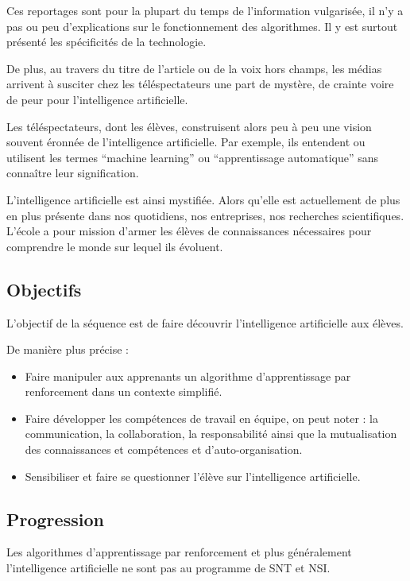 \documentclass[
12pt,
french,
]{article}
\begin{document}
Ces reportages sont pour la plupart du temps de l'information
vulgarisée, il n'y a pas ou peu d'explications sur le fonctionnement des
algorithmes. Il y est surtout présenté les spécificités de la
technologie.

De plus, au travers du titre de l'article ou de la voix hors champs, les
médias arrivent à susciter chez les téléspectateurs une part de mystère,
de crainte voire de peur pour l'intelligence artificielle.

Les téléspectateurs, dont les élèves, construisent alors peu à peu une
vision souvent éronnée de l'intelligence artificielle. Par exemple, ils
entendent ou utilisent les termes ``machine learning'' ou
``apprentissage automatique'' sans connaître leur signification.

L'intelligence artificielle est ainsi mystifiée. Alors qu'elle est
actuellement de plus en plus présente dans nos quotidiens, nos
entreprises, nos recherches scientifiques. L'école a pour mission
d'armer les élèves de connaissances nécessaires pour comprendre le monde
sur lequel ils évoluent.

\hypertarget{objectifs}{%
\subsection{Objectifs}\label{objectifs}}

L'objectif de la séquence est de faire découvrir l'intelligence
artificielle aux élèves.

De manière plus précise :

\begin{itemize}
\item
  Faire manipuler aux apprenants un algorithme d'apprentissage par
  renforcement dans un contexte simplifié.
\item
  Faire développer les compétences de travail en équipe, on peut noter :
  la communication, la collaboration, la responsabilité ainsi que la
  mutualisation des connaissances et compétences et d'auto-organisation.
\item
  Sensibiliser et faire se questionner l'élève sur l'intelligence
  artificielle.
\end{itemize}

\hypertarget{progression}{%
\subsection{Progression}\label{progression}}

Les algorithmes d'apprentissage par renforcement et plus généralement
l'intelligence artificielle ne sont pas au programme de SNT et NSI.
\end{document}
